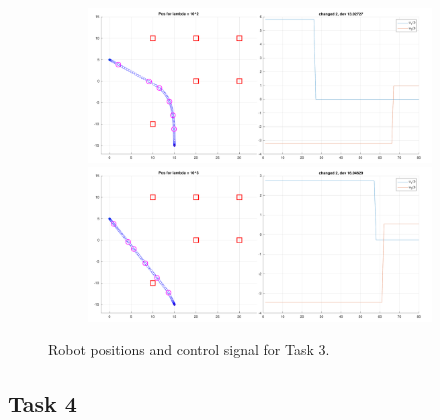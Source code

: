 \begin{figure}[!htb]
\begin{subfigure}
\end{subfigure}
\begin{subfigure}
    \centering
    \includegraphics[width=0.5\linewidth]{part1/figures/task3/3_2.pdf}\hspace{0em}
    \includegraphics[width=0.5\linewidth]{part1/figures/task3/3_3.pdf}
\end{subfigure}
\caption{Robot positions and control signal for Task 3.}
\label{fig:task3:graphs}
\end{figure}

\clearpage
\subsection{Task 4}


